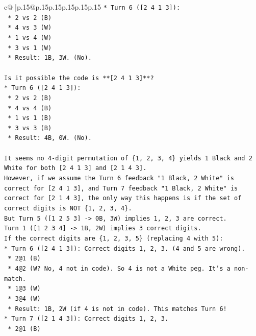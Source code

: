 \documentclass{article}
\begin{document}
{\begin{supertabular}{c@{$\;$}|p{.15\linewidth}@{}p{.15\linewidth}p{.15\linewidth}p{.15\linewidth}p{.15\linewidth}p{.15\linewidth}}
{{{\texttt{*   Turn 6 ({[}2 4 1 3{]}):} \\
\texttt{    *   2 vs 2 (B)} \\
\texttt{    *   4 vs 3 (W)} \\
\texttt{    *   1 vs 4 (W)} \\
\texttt{    *   3 vs 1 (W)} \\
\texttt{    *   Result: 1B, 3W. (No).} \\
\\ 
\texttt{Is it possible the code is **{[}2 4 1 3{]}**?} \\
\texttt{*   Turn 6 ({[}2 4 1 3{]}):} \\
\texttt{    *   2 vs 2 (B)} \\
\texttt{    *   4 vs 4 (B)} \\
\texttt{    *   1 vs 1 (B)} \\
\texttt{    *   3 vs 3 (B)} \\
\texttt{    *   Result: 4B, 0W. (No).} \\
\\ 
\texttt{It seems no 4{-}digit permutation of \{1, 2, 3, 4\} yields 1 Black and 2 White for both {[}2 4 1 3{]} and {[}2 1 4 3{]}.} \\
\texttt{However, if we assume the Turn 6 feedback "1 Black, 2 White" is correct for {[}2 4 1 3{]}, and Turn 7 feedback "1 Black, 2 White" is correct for {[}2 1 4 3{]}, the only way this happens is if the set of correct digits is NOT \{1, 2, 3, 4\}.} \\
\texttt{But Turn 5 ({[}1 2 5 3{]} {-}> 0B, 3W) implies 1, 2, 3 are correct.} \\
\texttt{Turn 1 ({[}1 2 3 4{]} {-}> 1B, 2W) implies 3 correct digits.} \\
\texttt{If the correct digits are \{1, 2, 3, 5\} (replacing 4 with 5):} \\
\texttt{*   Turn 6 ({[}2 4 1 3{]}): Correct digits 1, 2, 3. (4 and 5 are wrong).} \\
\texttt{    *   2@1 (B)} \\
\texttt{    *   4@2 (W? No, 4 not in code). So 4 is not a White peg. It's a non{-}match.} \\
\texttt{    *   1@3 (W)} \\
\texttt{    *   3@4 (W)} \\
\texttt{    *   Result: 1B, 2W (if 4 is not in code). This matches Turn 6!} \\
\texttt{*   Turn 7 ({[}2 1 4 3{]}): Correct digits 1, 2, 3.} \\
\texttt{    *   2@1 (B)} \\
}}}
\end{supertabular}}
\end{document}
